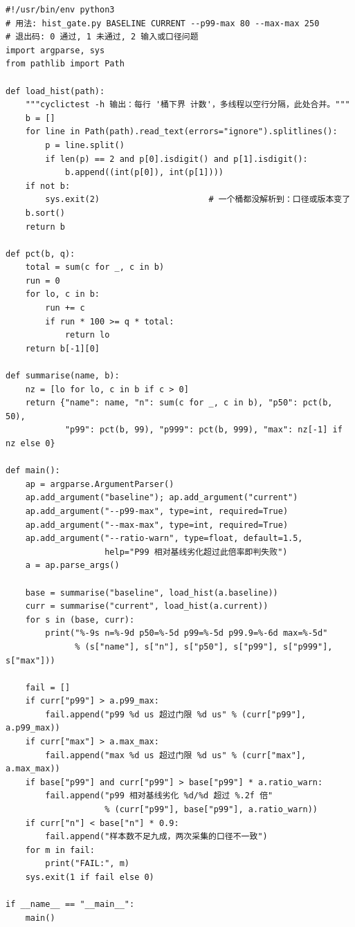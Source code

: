 \documentclass[12pt,a4paper,fontset=fandol]{ctexbook}
\begin{document}
\begin{lstlisting}[style=pythonstyle,caption={Python：直方图读取、分位数计算与回归门判定},label={lst:ch11-hist-gate}]
#!/usr/bin/env python3
# 用法: hist_gate.py BASELINE CURRENT --p99-max 80 --max-max 250
# 退出码: 0 通过, 1 未通过, 2 输入或口径问题
import argparse, sys
from pathlib import Path

def load_hist(path):
    """cyclictest -h 输出：每行 '桶下界 计数'，多线程以空行分隔，此处合并。"""
    b = []
    for line in Path(path).read_text(errors="ignore").splitlines():
        p = line.split()
        if len(p) == 2 and p[0].isdigit() and p[1].isdigit():
            b.append((int(p[0]), int(p[1])))
    if not b:
        sys.exit(2)                      # 一个桶都没解析到：口径或版本变了
    b.sort()
    return b

def pct(b, q):
    total = sum(c for _, c in b)
    run = 0
    for lo, c in b:
        run += c
        if run * 100 >= q * total:
            return lo
    return b[-1][0]

def summarise(name, b):
    nz = [lo for lo, c in b if c > 0]
    return {"name": name, "n": sum(c for _, c in b), "p50": pct(b, 50),
            "p99": pct(b, 99), "p999": pct(b, 999), "max": nz[-1] if nz else 0}

def main():
    ap = argparse.ArgumentParser()
    ap.add_argument("baseline"); ap.add_argument("current")
    ap.add_argument("--p99-max", type=int, required=True)
    ap.add_argument("--max-max", type=int, required=True)
    ap.add_argument("--ratio-warn", type=float, default=1.5,
                    help="P99 相对基线劣化超过此倍率即判失败")
    a = ap.parse_args()

    base = summarise("baseline", load_hist(a.baseline))
    curr = summarise("current", load_hist(a.current))
    for s in (base, curr):
        print("%-9s n=%-9d p50=%-5d p99=%-5d p99.9=%-6d max=%-5d"
              % (s["name"], s["n"], s["p50"], s["p99"], s["p999"], s["max"]))

    fail = []
    if curr["p99"] > a.p99_max:
        fail.append("p99 %d us 超过门限 %d us" % (curr["p99"], a.p99_max))
    if curr["max"] > a.max_max:
        fail.append("max %d us 超过门限 %d us" % (curr["max"], a.max_max))
    if base["p99"] and curr["p99"] > base["p99"] * a.ratio_warn:
        fail.append("p99 相对基线劣化 %d/%d 超过 %.2f 倍"
                    % (curr["p99"], base["p99"], a.ratio_warn))
    if curr["n"] < base["n"] * 0.9:
        fail.append("样本数不足九成，两次采集的口径不一致")
    for m in fail:
        print("FAIL:", m)
    sys.exit(1 if fail else 0)

if __name__ == "__main__":
    main()
\end{lstlisting}
\end{document}
